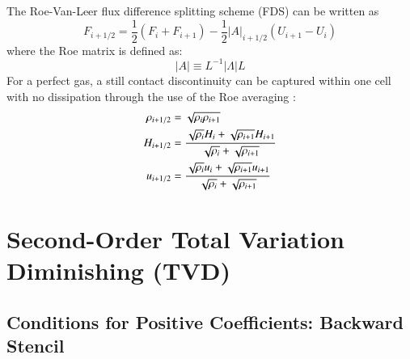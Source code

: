 \documentclass{warpdoc}
\newcommand{\alb}{\vspace{0.1cm}\\} %
\begin{document}
The Roe-Van-Leer flux difference splitting scheme (FDS) can be written as
%
\begin{equation}
F_{i+1/2}=\frac{1}{2} \left( F_i + F_{i+1}\right) - \frac{1}{2}|A|_{i+1/2}\left(U_{i+1}-U_i \right) 
\end{equation}
%
where the Roe matrix is defined as:
%
\begin{equation}
|A|\equiv L^{-1} |\Lambda| L
\end{equation}
%
For a perfect gas, a still contact discontinuity can be captured within one cell with no dissipation through the use of the Roe averaging \cite{jcp:1981:roe}:
%
\begin{align}
\rho_{i+1/2} &= \sqrt{\rho_i \rho_{i+1}} \alb
H_{i+1/2} &= \frac{\sqrt{\rho_i}H_i + \sqrt{\rho_{i+1}}H_{i+1}}{\sqrt{\rho_i}+\sqrt{\rho_{i+1}}} \alb
u_{i+1/2} &= \frac{\sqrt{\rho_i}u_i + \sqrt{\rho_{i+1}}u_{i+1}}{\sqrt{\rho_i}+\sqrt{\rho_{i+1}}}
\end{align}
%



\section{Second-Order Total Variation Diminishing (TVD)}


\subsection{Conditions for Positive Coefficients: Backward Stencil}
\end{document}
